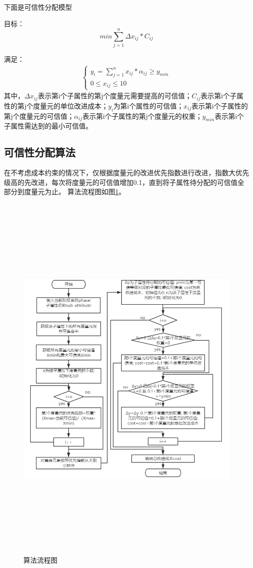 下面是可信性分配模型

目标：
\begin{equation}
    min\sum_{j=1}^n \Delta x_{ij}* C_{ij}
\end{equation}

满足：
\begin{align}
\left\{
\begin{array}{l}
y_i=\sum_{j=1}^n x_{ij}*{\alpha_{ij}}\geq y_{min}\\
0 \leq x_{ij}\leq 10
\end{array}
\right.
\end{align}
其中，$\Delta x_{ij}$表示第i个子属性的第j个度量元需要提高的可信值；$C_{ij}$表示第i个子属性的第j个度量元的单位改进成本；$y_i$为第i个属性的可信值；$x_{ij}$表示第i个子属性的第j个度量元的可信值；$\alpha_{ij}$表示第i个子属性的第j个度量元的权重；$y_{min}$表示第i个子属性需达到的最小可信值。

\subsection{可信性分配算法\uppercase\expandafter{}}
在不考虑成本约束的情况下，仅根据度量元的改进优先指数进行改进，指数大优先级高的先改进，每次将度量元的可信值增加0.1，直到将子属性待分配的可信值全部分到度量元为止。
算法流程图如图\ref{fig:4_01}。

\begin{figure}[H]
	\centering
	\includegraphics[width=15cm,height=19cm]{fig/4_1.png}
	\caption{算法\uppercase\expandafter{}流程图}
	\label{fig:4_01}
\end{figure}


